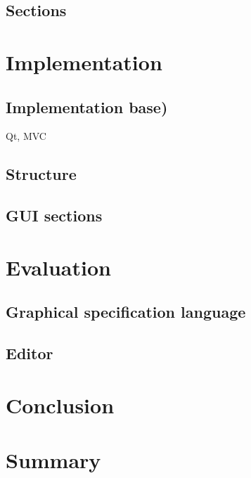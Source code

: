 \documentclass[twoside, openright, 12pt]{book}
\begin{document}
\section{Sections}
\label{editor_sections}




\cleardoublepage
\chapter{Implementation}
\label{implementation}
	
	
\section{Implementation base)}
\label{implementation_base}
Qt, MVC

\section{Structure}
\label{implementation_structure}
	
	
\section{GUI sections}
\label{implementation_sections}




\cleardoublepage
\chapter{Evaluation}
\label{evaluation}


\section{Graphical specification language}
\label{evaluation_gsl}


\section{Editor}
\label{evaluation_editor}


\cleardoublepage
\chapter{Conclusion}
\label{conclusion}
\blindtext



\cleardoublepage
\chapter{Summary}
\label{summary}
\blindtext
\end{document}
